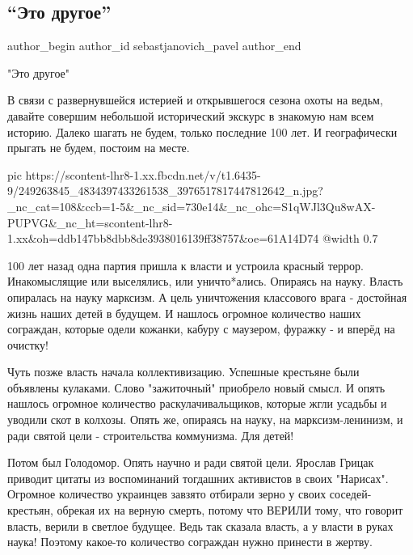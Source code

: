  
 
 
 
 
 
\subsection{\enquote{Это другое}}
\label{sec:28_10_2021.fb.sebastjanovich_pavel.1.eto_drugoje}
 
\ifcmt
 author_begin
   author_id sebastjanovich_pavel
 author_end
\fi

"Это другое"

В связи с развернувшейся истерией и открывшегося сезона охоты на ведьм, давайте
совершим небольшой исторический экскурс в знакомую нам всем историю. Далеко
шагать не будем, только последние 100 лет. И географически прыгать не будем,
постоим на месте.

\ifcmt
  pic https://scontent-lhr8-1.xx.fbcdn.net/v/t1.6435-9/249263845_4834397433261538_3976517817447812642_n.jpg?_nc_cat=108&ccb=1-5&_nc_sid=730e14&_nc_ohc=S1qWJl3Qu8wAX-PUPVG&_nc_ht=scontent-lhr8-1.xx&oh=ddb147bb8dbb8de3938016139ff38757&oe=61A14D74
  @width 0.7
\fi

100 лет назад одна партия пришла к власти и устроила красный террор.
Инакомыслящие или выселялись, или уничто*ались. Опираясь на науку. Власть
опиралась на науку марксизм. А цель уничтожения классового врага - достойная
жизнь наших детей в будущем. И нашлось огромное количество наших сограждан,
которые одели кожанки, кабуру с маузером, фуражку - и вперёд на очистку!

Чуть позже власть начала коллективизацию. Успешные крестьяне были объявлены
кулаками. Слово "зажиточный" приобрело новый смысл. И опять нашлось огромное
количество раскулачивальщиков, которые жгли усадьбы и уводили скот в колхозы.
Опять же, опираясь на науку, на марксизм-ленинизм, и ради святой цели -
строительства коммунизма. Для детей!

Потом был Голодомор. Опять научно и ради святой цели. Ярослав Грицак приводит
цитаты из воспоминаний тогдашних активистов в своих "Нарисах". Огромное
количество украинцев завзято отбирали зерно у своих соседей-крестьян, обрекая
их на верную смерть, потому что ВЕРИЛИ тому, что говорит власть, верили в
светлое будущее. Ведь так сказала власть, а у власти в руках наука! Поэтому
какое-то количество сограждан нужно принести в жертву.

